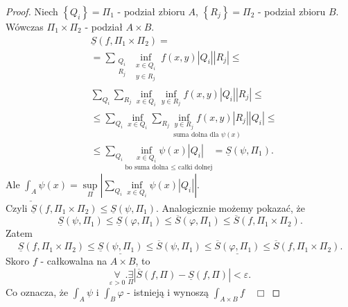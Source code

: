 \documentclass[../main.tex]{subfiles}
\begin{document}
    \begin{proof}
        Niech $\left\{ Q_i \right\} = \Pi_1$ - podział zbioru $A$, $\left\{ R_j \right\} = \Pi_2$ - podział zbioru $B$.\\
        Wówczas  $\Pi_1 \times \Pi_2$ - podział $A\times B$.
        \begin{align*}
            &\underline{S}(f,\Pi_1\times \Pi_2) = \\
            &= \sum_{\substack{Q_i\\ R_j}} \underset{\substack{x\in Q_i\\ y\in R_j}}{\inf} f(x,y) |Q_i| |R_j| \le\\
            &\sum_{Q_i}\sum_{R_j} \underset{x\in Q_i}{\inf} \underset{y\in R_j}{\inf} f(x,y) |Q_i| |R_j|\le\\
            &\le \sum_{Q_i}\underset{x\in Q_i}{\inf} \underset{\text{suma dolna dla $\psi(x)$}}{\sum_{R_j}\underset{y\in R_j}{\inf} f(x,y) |R_j| |Q_i|}\le\\
            &\le\sum_{Q_i}\underset{\text{bo suma dolna $\le$ całki dolnej}}{\underset{x\in Q_i}{\inf} \psi(x) |Q_i|} = \underline{S}(\psi,\Pi_1)
        .\end{align*}
        Ale $\underline{\int_A}\psi(x) = \underset{\Pi}{\sup} \left| \sum_{Q_i}\underset{x\in Q_i}{\inf} \psi(x) | Q_i | \right|$.\\
        Czyli $\underline{S}(f,\Pi_1\times\Pi_2) \le \underline{S}(\psi,\Pi_1)$. Analogicznie możemy pokazać, że\\
        \[\underline{S}(\psi,\Pi_1)\le\underline{S}(\varphi,\Pi_1)\le\overline{S}(\varphi,\Pi_1) \le\overline{S}(f,\Pi_1\times\Pi_2).\]
        Zatem
        \[
            \underline{S}(f,\Pi_1\times\Pi_2) \le \underline{\underline{S}(\psi,\Pi_1)} \le \overline{S}(\psi, \Pi_1) \le \underline{\overline{S}(\varphi,\Pi_1)} \le \overline{S}(f,\Pi_1\times\Pi_2)
        .\]
        Skoro $f$ - całkowalna na $A\times B$, to
    \[
        \underset{\varepsilon>0}{\forall} .\underset{\Pi}{\exists} |\overline{S}(f,\Pi) - \underline{S}(f,\Pi)|<\varepsilon
    .\]
    Co oznacza, że $\int_A \psi$ i $\int_B \varphi$ - istnieją i wynoszą $\int_{A\times B} f \quad\Box$

    \end{proof}
\end{document}
